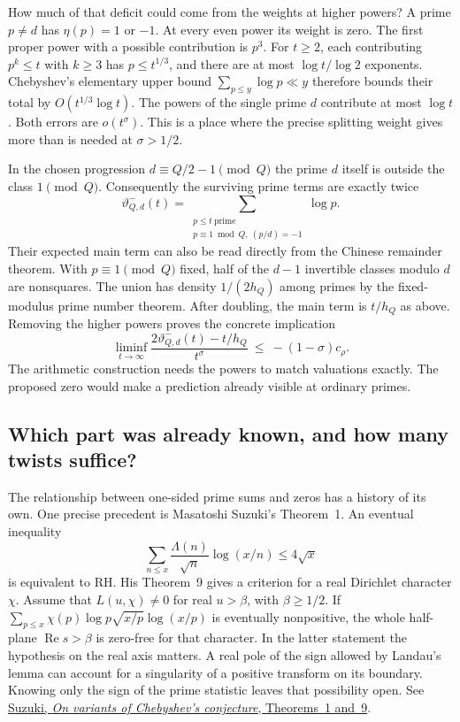 \documentclass[11pt,letterpaper]{article}
\renewcommand{\Re}{\operatorname{Re}}
\begin{document}
How much of that deficit could come from the weights at higher powers? A prime \(p\ne d\) has \(\eta(p)=1\) or \(-1\). At every even power its weight is zero. The first proper power with a possible contribution is \(p^3\). For \(t\ge2\), each contributing \(p^k\le t\) with \(k\ge3\) has \(p\le t^{1/3}\), and there are at most \(\log t/\log2\) exponents. Chebyshev's elementary upper bound \(\sum_{p\le y}\log p\ll y\) therefore bounds their total by \(O(t^{1/3}\log t)\). The powers of the single prime \(d\) contribute at most \(\log t\). Both errors are \(o(t^\sigma)\). This is a place where the precise splitting weight gives more than is needed at \(\sigma>1/2\).

In the chosen progression \(d\equiv Q/2-1\pmod Q\) the prime \(d\) itself is outside the class \(1\pmod Q\). Consequently the surviving prime terms are exactly twice
\[
 \vartheta_{Q,d}^{-}(t)
   =\sum_{\substack{p\le t\ \mathrm{prime}\\
                   p\equiv1\bmod Q,\ (p/d)=-1}}\log p .
\]
Their expected main term can also be read directly from the Chinese remainder theorem. With \(p\equiv1\pmod Q\) fixed, half of the \(d-1\) invertible classes modulo \(d\) are nonsquares. The union has density \(1/(2h_Q)\) among primes by the fixed-modulus prime number theorem. After doubling, the main term is \(t/h_Q\) as above. Removing the higher powers proves the concrete implication
\begin{equation}
 \liminf_{t\to\infty}
 \frac{2\vartheta_{Q,d}^{-}(t)-t/h_Q}{t^\sigma}
      \ \le\ -(1-\sigma)c_\rho .
 \label{eq:analyticlab-prime-deficit}
\end{equation}
The arithmetic construction needs the powers to match valuations exactly. The proposed zero would make a prediction already visible at ordinary primes.

\subsection{Which part was already known, and how many twists suffice?}

The relationship between one-sided prime sums and zeros has a history of its own. One precise precedent is Masatoshi Suzuki's Theorem~1. An eventual inequality
\[
 \sum_{n\le x}\frac{\Lambda(n)}{\sqrt n}\log(x/n)\le4\sqrt x
\]
is equivalent to RH. His Theorem~9 gives a criterion for a real Dirichlet character \(\chi\). Assume that \(L(u,\chi)\ne0\) for real \(u>\beta\), with \(\beta\ge1/2\). If \(\sum_{p\le x}\chi(p)\log p\sqrt{x/p}\log(x/p)\) is eventually nonpositive, the whole half-plane \(\Re s>\beta\) is zero-free for that character. In the latter statement the hypothesis on the real axis matters. A real pole of the sign allowed by Landau's lemma can account for a singularity of a positive transform on its boundary. Knowing only the sign of the prime statistic leaves that possibility open. See \href{https://doi.org/10.1007/s11139-025-01238-9}{Suzuki, \emph{On variants of Chebyshev's conjecture}, Theorems~1 and~9}.
\end{document}
